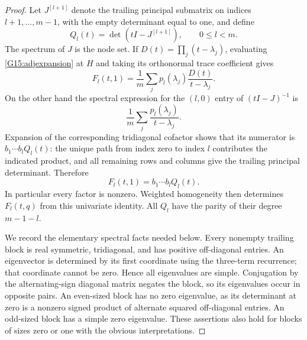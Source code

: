 \documentclass[11pt,a4paper]{article}
\theoremstyle{definition}\newtheorem{definition}{Definition}
\begin{document}
\begin{proof}
Let $J^{[l+1]}$ denote the trailing principal submatrix
on indices $l+1,\ldots,m-1$, with the empty determinant
equal to one, and define
\[
 Q_l(t)=\det(tI-J^{[l+1]}),\qquad 0\leq l<m.
\]
The spectrum of $J$ is the node set. If
$D(t)=\prod_j(t-\lambda_j)$, evaluating
\eqref{G15:adjexpansion} at $H$ and taking its
orthonormal trace coefficient gives
\[
 F_l(t,1)=\frac1m\sum_jp_l(\lambda_j)
                         \frac{D(t)}{t-\lambda_j}.
\]
On the other hand the spectral expression for the
$(l,0)$ entry of $(tI-J)^{-1}$ is
\[
 \frac1m\sum_j\frac{p_l(\lambda_j)}{t-\lambda_j}.
\]
Expansion of the corresponding tridiagonal cofactor
shows that its numerator is
$b_1\cdots b_l Q_l(t)$: the unique path from index
zero to index $l$ contributes the indicated product,
and all remaining rows and columns give the trailing
principal determinant. Therefore
\begin{equation}\label{G15:jacobi}
 F_l(t,1)=b_1\cdots b_l Q_l(t).
\end{equation}
In particular every factor is nonzero. Weighted
homogeneity then determines $F_l(t,q)$ from this
univariate identity. All $Q_l$ have the parity of
their degree $m-1-l$.

We record the elementary spectral facts needed below.
Every nonempty trailing block is real symmetric,
tridiagonal, and has positive off-diagonal entries.
An eigenvector is determined by its first coordinate
using the three-term recurrence; that coordinate cannot
be zero. Hence all eigenvalues are simple. Conjugation
by the alternating-sign diagonal matrix negates the
block, so its eigenvalues occur in opposite pairs.
An even-sized block has no zero eigenvalue, as its
determinant at zero is a nonzero signed product of
alternate squared off-diagonal entries. An odd-sized
block has a simple zero eigenvalue. These assertions
also hold for blocks of sizes zero or one with the
obvious interpretations.


\end{proof}
\end{document}

